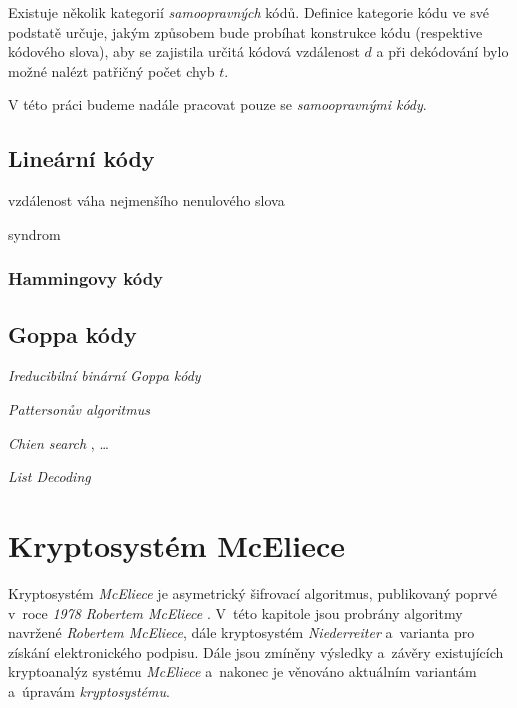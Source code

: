 \documentclass[thesis=M,czech,hidelinks]{FITthesis}[2012/06/26]
\newcommand{\0}{{\textcolor[gray]{0.80}{0}}}
\begin{document}
Existuje několik kategorií \emph{samoopravných} kódů. Definice kategorie kódu ve
své podstatě určuje, jakým způsobem bude probíhat konstrukce kódu (respektive
kódového slova), aby se zajistila určitá kódová vzdálenost $d$ a při dekódování
bylo možné nalézt patřičný počet chyb $t$.

V této práci budeme nadále pracovat pouze se \emph{samoopravnými kódy}.



\section{Lineární kódy}

vzdálenost váha nejmenšího nenulového slova

syndrom

\subsection{Hammingovy kódy}

\section{Goppa kódy}

\emph{Ireducibilní binární Goppa kódy}

\emph{Pattersonův algoritmus}

\emph{Chien search} , \ldots

\emph{List Decoding}  \cite{Repka}




\chapter{Kryptosystém McEliece}\label{kap_mceliece}

Kryptosystém \emph{McEliece} je asymetrický šifrovací algoritmus, publikovaný
poprvé v~roce \emph{1978} \emph{Robertem McEliece} \cite{McEliece}. V~této
kapitole jsou probrány algoritmy navržené \emph{Robertem McEliece}, dále
kryptosystém \emph{Niederreiter} a~varianta pro získání elektronického podpisu.
Dále jsou zmíněny výsledky a~závěry existujících kryptoanalýz systému
\emph{McEliece} a~nakonec je věnováno aktuálním variantám a~úpravám
\emph{kryptosystému}.
\end{document}
